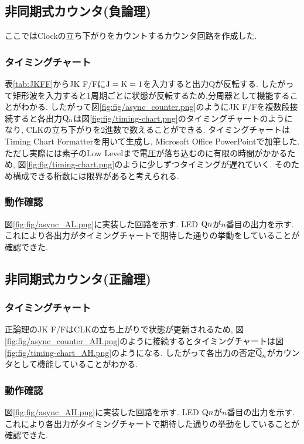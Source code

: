 \subsection{非同期式カウンタ(負論理)}
ここではClockの立ち下がりをカウントするカウンタ回路を作成した.
\subsubsection{タイミングチャート}
表\ref{tab:JKFF}からJK F/Fに$\rm J=K=1$を入力すると出力Qが反転する.
したがって矩形波を入力すると1周期ごとに状態が反転するため,分周器として機能することがわかる.
したがって図\ref{fig:fig/async_counter.png}のようにJK F/Fを複数段接続すると各出力$\rm Q_n$は図\ref{fig:fig/timing-chart.png}のタイミングチャートのようになり,
CLKの立ち下がりを2進数で数えることができる.
タイミングチャートはTiming Chart Formatter\cite{TimingCh73}を用いて生成し,
Microsoft Office PowerPointで加筆した.
ただし実際には素子のLow Levelまで電圧が落ち込むのに有限の時間がかかるため,
図\ref{fig:fig/timing-chart.png}のように少しずつタイミングが遅れていく.
そのため構成できる桁数には限界があると考えられる.
\clearpage
\subsubsection{動作確認}
図\ref{fig:fig/async_AL.png}に実装した回路を示す.
LED ${\rm Q}n$が$n$番目の出力を示す.
これにより各出力がタイミングチャートで期待した通りの挙動をしていることが確認できた.
\clearpage
\subsection{非同期式カウンタ(正論理)}
\subsubsection{タイミングチャート}
正論理のJK F/FはCLKの立ち上がりで状態が更新されるため,
図\ref{fig:fig/async_counter_AH.png}のように接続するとタイミングチャートは図\ref{fig:fig/timing-chart_AH.png}のようになる.
したがって各出力の否定${\rm\overline{Q}}_n$がカウンタとして機能していることがわかる.
\clearpage
\subsubsection{動作確認}
図\ref{fig:fig/async_AH.png}に実装した回路を示す.
LED ${\rm Q}n$が$n$番目の出力を示す.
これにより各出力がタイミングチャートで期待した通りの挙動をしていることが確認できた.
